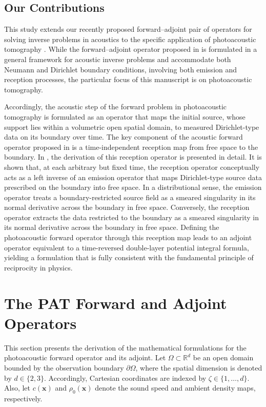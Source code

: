 \documentclass[11pt,reqno]{amsart}
\theoremstyle{remark}
\newcommand{\bx}{\boldsymbol{x}}
\begin{document}
\subsection{Our Contributions}
This study extends our recently proposed forward--adjoint pair of operators for solving inverse problems in acoustics to the specific application of photoacoustic tomography \cite{Javaherian2022}. While the forward–adjoint operator proposed in \cite{Javaherian2022} is formulated in a general framework for acoustic inverse problems and accommodate both Neumann and Dirichlet boundary conditions, involving both emission and reception processes, the particular focus of this manuscript is on photoacoustic tomography.

Accordingly, the acoustic step of the forward problem in photoacoustic tomography is formulated as an operator that maps the initial source, whose support lies within a volumetric open spatial domain, to measured Dirichlet-type data on its boundary over time. The key component of the acoustic forward operator proposed in \cite{Javaherian2022} is a time-independent reception map from free space to the boundary. In \cite{Javaherian2022}, the derivation of this reception operator is presented in detail. It is shown that, at each arbitrary but fixed time, the reception operator conceptually acts as a left inverse of an emission operator that maps Dirichlet-type source data prescribed on the boundary into free space. In a distributional sense, the emission operator treats a boundary-restricted source field as a smeared singularity in its normal derivative across the boundary in free space. Conversely, the reception operator extracts the data restricted to the boundary as a smeared singularity in its normal derivative across the boundary in free space.  Defining the photoacoustic forward operator through this reception map leads to an adjoint operator equivalent to a time-reversed double-layer potential integral formula, yielding a formulation that is fully consistent with the fundamental principle of reciprocity in physics.


\section{The PAT Forward and Adjoint Operators}   \label{sec:pat-forward-adjoint}

This section presents the derivation of the mathematical formulations for the photoacoustic forward operator and its adjoint. Let $\Omega \subset \mathbb{R}^d$ be an open domain bounded by the observation boundary $\partial \Omega$, where the spatial dimension is denoted by $d \in \{2,3\}$. Accordingly, Cartesian coordinates are indexed by $\zeta \in \{1,\ldots,d\}$. Also, let $c(\bx)$ and $\rho_0(\bx)$ denote the sound speed and ambient density maps, respectively.
\end{document}
